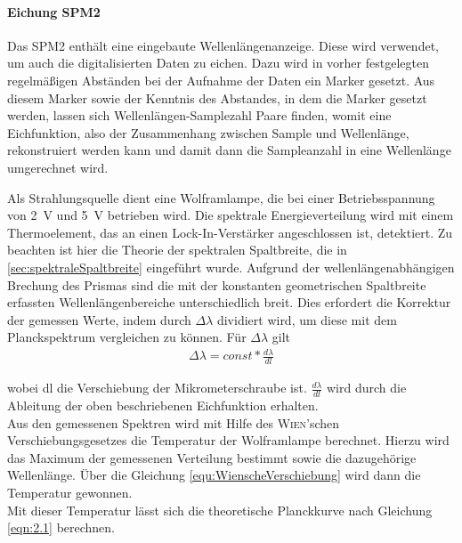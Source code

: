 \documentclass[a4paper,twoside,final]{article}
\begin{document}
\paragraph{Eichung SPM2}\label{par:EichungSPM2} Das SPM2 enthält eine eingebaute Wellenlängenanzeige. Diese wird verwendet, um auch die digitalisierten Daten zu eichen. Dazu wird in vorher festgelegten regelmäßigen Abständen bei der Aufnahme der Daten ein Marker gesetzt. Aus diesem Marker sowie der Kenntnis des Abstandes, in dem die Marker gesetzt werden, lassen sich Wellenlängen-Samplezahl Paare finden, womit eine Eichfunktion, also der Zusammenhang zwischen Sample und Wellenlänge, rekonstruiert werden kann und damit dann die Sampleanzahl in eine Wellenlänge umgerechnet wird.

Als Strahlungsquelle dient eine Wolframlampe, die bei einer Betriebsspannung von \SI{2}{V} und \SI{5}{V} betrieben wird. Die spektrale Energieverteilung wird mit einem Thermoelement, das an einen Lock-In-Verstärker angeschlossen ist, detektiert. Zu beachten ist hier die Theorie der spektralen Spaltbreite, die in \ref{sec:spektraleSpaltbreite} eingeführt wurde. Aufgrund der wellenlängenabhängigen Brechung des Prismas sind die mit der konstanten geometrischen Spaltbreite erfassten Wellenlängenbereiche unterschiedlich breit. Dies erfordert die Korrektur der gemessen Werte, indem durch $\Delta \lambda$ dividiert wird, um diese mit dem Planckspektrum vergleichen zu können. Für $\Delta \lambda$ gilt
\begin{align}
  \Delta \lambda = const* \frac{d\lambda}{dl}
\end{align}

wobei dl die Verschiebung der Mikrometerschraube ist.
$\frac{d\lambda}{dl}$ wird durch die Ableitung der oben beschriebenen Eichfunktion erhalten.\\

Aus den gemessenen Spektren wird mit Hilfe des \textsc{Wien}'schen Verschiebungsgesetzes die Temperatur der Wolframlampe berechnet. Hierzu wird das Maximum der gemessenen Verteilung bestimmt sowie die dazugehörige Wellenlänge. Über die Gleichung \ref{equ:WienscheVerschiebung} wird dann die Temperatur gewonnen. \\
Mit dieser Temperatur lässt sich die theoretische Planckkurve nach Gleichung \ref{eqn:2.1} berechnen.
\end{document}
